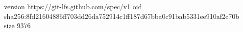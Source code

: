 version https://git-lfs.github.com/spec/v1
oid sha256:8fd21604886ff703dd26da752914c1ff187d67bba0c91bab5331ee910af2c70b
size 9376
